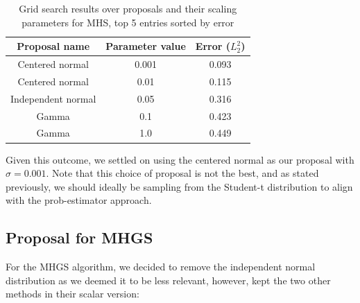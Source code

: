 \documentclass[12pt]{memoir}
\begin{document}
\begin{table}[H]


    \begin{center}

        \begin{tabular}{|c|c|c|}

            \hline

            Proposal name & Parameter value & Error ($L_2^2$)\\

            \hline\hline

            Centered normal& 0.001 & 0.093\\

            Centered normal&0.01  &0.115\\

            Independent normal& 0.05 &0.316\\

            Gamma&0.1  &0.423\\

            Gamma&1.0   &0.449\\\hline

        \end{tabular}

\end{center}

\caption{Grid search results over proposals and their scaling parameters for MHS, top 5 entries sorted by error}

\label{table:proposal-grid-search-mhs}

\end{table}

Given this outcome, we settled on using the centered normal as our proposal with $\sigma=0.001$. Note that this choice of proposal is not the best, and as stated previously, we should ideally be sampling from the Student-t distribution to align with the prob-estimator approach.


\subsection*{Proposal for MHGS}

For the MHGS algorithm, we decided to remove the independent normal distribution as we deemed it to be less relevant, however, kept the two other methods in their scalar version:
\end{document}
